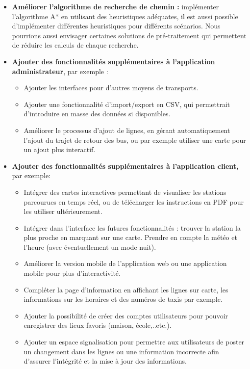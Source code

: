 \begin{itemize}
	\item \textbf{Améliorer l'algorithme de recherche de chemin :}  implémenter l'algorithme A* en utilisant des heuristiques adéquates, il est aussi possible d'implémenter différentes heuristiques pour différents scénarios.\newline
	Nous pourrions aussi envisager certaines solutions de pré-traitement qui permettent de réduire les calculs de chaque recherche.
	\item \textbf{Ajouter des fonctionnalités supplémentaires à l'application administrateur}, par exemple :
		\begin{itemize}
			\item Ajouter les interfaces pour d'autres moyens de transports.
			\item Ajouter une fonctionnalité d'import/export en CSV, qui permettrait d'introduire en masse des données si disponibles.
			\item Améliorer le processus d'ajout de lignes, en gérant automatiquement l'ajout du trajet de retour des bus, ou par exemple utiliser une carte pour un ajout plus interactif.
		\end{itemize}
	\item \textbf{Ajouter des fonctionnalités supplémentaires à l'application client,} par exemple:
		\begin{itemize}
			\item Intégrer des cartes interactives permettant de visualiser les stations parcourues en temps réel, ou de télécharger les instructions en PDF pour les utiliser ultérieurement.
			\item Intégrer dans l'interface les futures fonctionnalités : trouver la station la plus proche en marquant sur une carte. Prendre en compte la météo et l'heure (avec éventuellement un mode nuit).
			\item Améliorer la version mobile de l'application web ou une application mobile pour plus d'interactivité.
			\item Compléter la page d'information en affichant les lignes sur carte, les informations sur les horaires et des numéros de taxis par exemple.
			\item Ajouter la possibilité de créer des comptes utilisateurs pour pouvoir enregistrer des lieux favoris (maison, école,..etc.).
			\item Ajouter un espace signalisation pour permettre aux utilisateurs de poster un changement dans les lignes ou une information incorrecte afin d'assurer l'intégrité et la mise à jour des informations.
		\end{itemize}
\end{itemize}